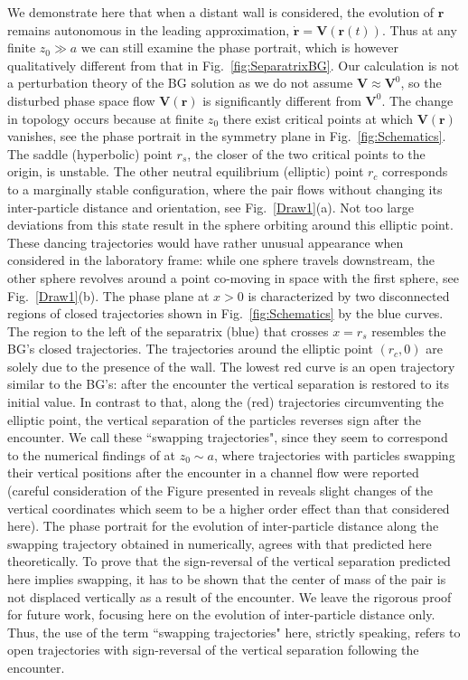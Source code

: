 We demonstrate here that when a distant wall is considered, the evolution of $\bm r$ remains autonomous in the leading approximation, $\dot{\bm r}=\bm V(\bm r(t))$. Thus at any finite $z_0\gg a$  we can still examine the phase portrait, which is however qualitatively different from that in Fig.~\ref{fig:SeparatrixBG}. Our calculation is not a perturbation theory of the BG solution as we do not assume $\bm V\approx \bm V^0$, so the disturbed phase space flow $\bm V(\bm r)$ is significantly different from $\bm V^0$. The change in topology occurs because at finite $z_0$ there exist critical points at which $\bm V(\bm r)$ vanishes, see the phase portrait in the symmetry plane in Fig.~\ref{fig:Schematics}. The saddle (hyperbolic) point $r_s$, the closer of the two critical points to the origin, is unstable. The other neutral equilibrium (elliptic) point $r_c$ corresponds to a marginally stable configuration, where the pair flows without changing its inter-particle distance and orientation, see Fig.~\ref{Draw1}(a). Not too large deviations from this state result in the sphere orbiting around this elliptic point. These dancing trajectories would have rather unusual appearance when considered in the laboratory frame: while one sphere travels downstream, the other sphere revolves around a point co-moving in space with the first sphere, see Fig.~\ref{Draw1}(b). The phase plane at $x>0$ is characterized by two disconnected regions of closed trajectories shown in Fig.~\ref{fig:Schematics} by the blue curves. The region to the left of
the separatrix (blue) that crosses $x=r_s$ resembles the BG's closed trajectories. The trajectories around the elliptic point $(r_c, 0)$ are solely due to the presence of the wall. The lowest red curve is an open trajectory similar to the BG's: after the encounter the vertical separation is restored to its initial value. In contrast to that, along the (red) trajectories circumventing the elliptic point, the vertical separation of the particles reverses sign after the encounter. We call these ``swapping trajectories", since they seem to correspond to the numerical findings of \cite{zurita-gotor_2007} at $z_0\sim a$, where trajectories with particles swapping their vertical positions after the encounter in a channel flow were reported (careful consideration of the Figure presented in \cite{zurita-gotor_2007} reveals slight changes of the vertical coordinates which seem to be a higher order effect than that considered here). The phase portrait for the evolution of inter-particle distance along the swapping trajectory obtained in \cite{zurita-gotor_2007} numerically, agrees with that predicted here theoretically. To prove that the sign-reversal of the vertical separation predicted here implies swapping, it has to be shown that the center of mass of the pair is not displaced vertically as a result of the encounter. We leave the rigorous proof for future work, focusing here on the evolution of inter-particle distance only. Thus, the use of the term ``swapping trajectories" here, strictly speaking, refers to open trajectories with sign-reversal of the vertical separation following the encounter.

